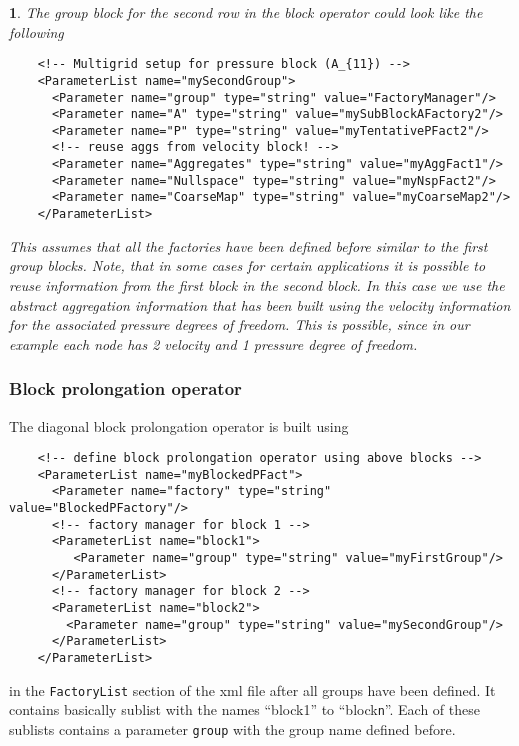 \documentclass[10pt,fleqn]{book}
\newtheorem*{mycomment}{\ding{42}}
\begin{document}
\begin{mycomment}
The group block for the second row in the block operator could look like the following
\begin{lstlisting}
    <!-- Multigrid setup for pressure block (A_{11}) -->
    <ParameterList name="mySecondGroup">
      <Parameter name="group" type="string" value="FactoryManager"/>
      <Parameter name="A" type="string" value="mySubBlockAFactory2"/>
      <Parameter name="P" type="string" value="myTentativePFact2"/>
      <!-- reuse aggs from velocity block! -->
      <Parameter name="Aggregates" type="string" value="myAggFact1"/>
      <Parameter name="Nullspace" type="string" value="myNspFact2"/>
      <Parameter name="CoarseMap" type="string" value="myCoarseMap2"/>
    </ParameterList>
\end{lstlisting}
This assumes that all the factories have been defined before similar to the first group blocks. Note, that in some cases for certain applications it is possible to reuse information from the first block in the second block. In this case we use the abstract aggregation information that has been built using the velocity information for the associated pressure degrees of freedom. This is possible, since in our example each node has 2 velocity and 1 pressure degree of freedom.
\end{mycomment}

\subsubsection{Block prolongation operator}

The diagonal block prolongation operator is built using
\begin{lstlisting}
    <!-- define block prolongation operator using above blocks -->
    <ParameterList name="myBlockedPFact">
      <Parameter name="factory" type="string" value="BlockedPFactory"/>
      <!-- factory manager for block 1 -->
      <ParameterList name="block1">
         <Parameter name="group" type="string" value="myFirstGroup"/>
      </ParameterList>
      <!-- factory manager for block 2 -->
      <ParameterList name="block2">
        <Parameter name="group" type="string" value="mySecondGroup"/>
      </ParameterList>
    </ParameterList>
\end{lstlisting}
in the \texttt{FactoryList} section of the xml file after all groups have been defined. It contains basically sublist with the names ``block1'' to ``block\texttt{n}''. Each of these sublists contains a parameter \texttt{group} with the group name defined before.
\end{document}
